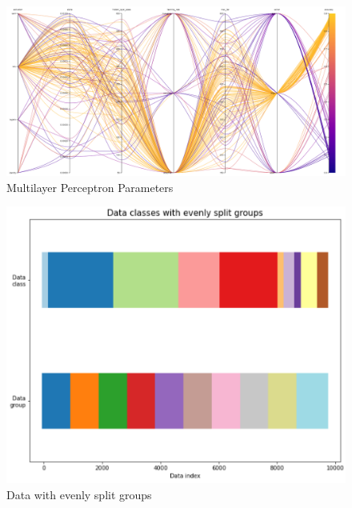 \documentclass[11pt]{article}
\begin{document}
\begin{appendices}
\begin{figure}[h]
  \caption {Multilayer Perceptron Parameters} \label{ParallelCoordMLP}
  \centering 
  \includegraphics[width = \textwidth, height = \textwidth, keepaspectratio]{Images/MLP ParallelCoordGraph.png}
\end{figure}
\FloatBarrier

\begin{figure}[h]
  \caption {Data with evenly split groups} \label{DataWWithEvenlySplitGroups}
  \centering 
  \includegraphics[width = \textwidth, height = 0.5\textwidth, keepaspectratio]{Images/DataWithEvenlySplitGroups.png}
\end{figure}



\end{appendices}
\end{document}
